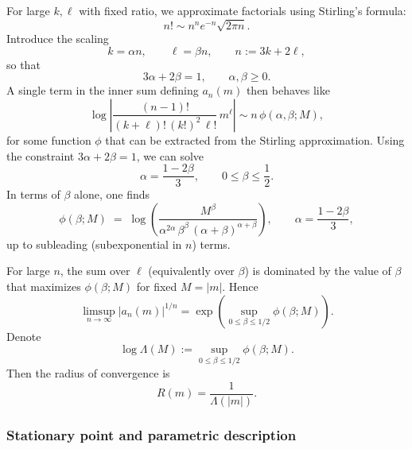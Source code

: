 \documentclass[11pt, a4paper]{article}
\numberwithin{equation}{section}
\begin{document}
For large $k,\ell$ with fixed ratio, we approximate factorials using Stirling's
formula:
\begin{equation}
  n! \sim n^n e^{-n}\sqrt{2\pi n}.
\end{equation}
Introduce the scaling
\begin{equation}
  k = \alpha n,\qquad \ell = \beta n,\qquad
  n := 3k+2\ell,
\end{equation}
so that
\begin{equation}
  3\alpha + 2\beta = 1,\qquad \alpha,\beta\ge 0.
\end{equation}
A single term in the inner sum defining $a_n(m)$ then behaves like
\begin{equation}
  \log\left|
  \frac{(n-1)!}{(k+\ell)!\,(k!)^2\,\ell!}\,m^\ell
  \right|
  \sim n\,\phi(\alpha,\beta;M),
\end{equation}
for some function $\phi$ that can be extracted from the Stirling approximation.
Using the constraint $3\alpha+2\beta=1$, we can solve
\begin{equation}
  \alpha = \frac{1-2\beta}{3},\qquad 0\le \beta\le \frac12.
\end{equation}
In terms of $\beta$ alone, one finds
\begin{equation}
  \phi(\beta;M)
  \;=\;
  \log\!\left(
  \frac{M^\beta}{\alpha^{2\alpha}\,\beta^\beta\,(\alpha+\beta)^{\alpha+\beta}}
  \right),
  \qquad
  \alpha = \frac{1-2\beta}{3},
\end{equation}
up to subleading (subexponential in $n$) terms.

For large $n$, the sum over $\ell$ (equivalently over $\beta$) is dominated by
the value of $\beta$ that maximizes $\phi(\beta;M)$ for fixed $M=|m|$. Hence
\begin{equation}
  \limsup_{n\to\infty} |a_n(m)|^{1/n}
  = \exp\!\left(
    \sup_{0\le \beta\le 1/2} \phi(\beta;M)
  \right).
\end{equation}
Denote
\begin{equation}
  \log \Lambda(M)
  := \sup_{0\le \beta\le 1/2} \phi(\beta;M).
\end{equation}
Then the radius of convergence is
\begin{equation}
  R(m) = \frac{1}{\Lambda(|m|)}.
\end{equation}

\subsubsection{Stationary point and parametric description}
\end{document}
